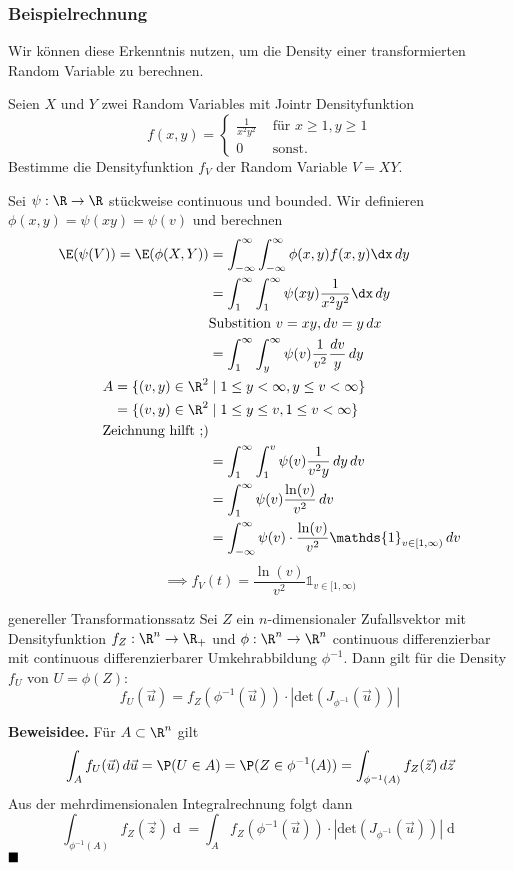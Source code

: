 \subsubsection*{Beispielrechnung}

Wir können diese Erkenntnis nutzen, um die Density einer transformierten Random Variable zu berechnen.

Seien $X$ und $Y$ zwei Random Variables mit Jointr Densityfunktion
$$f(x,y) = \begin{cases}
    \frac{1}{x^2y^2} & \text{ für } x \geq 1, y \geq 1\\
    0 & \text{ sonst.}
\end{cases}$$
Bestimme die Densityfunktion $f_V$ der Random Variable $V = XY$.

Sei $\psi: \R \to \R$ stückweise continuous und bounded.
Wir definieren $\phi(x, y) = \psi(xy) = \psi(v)$ und berechnen 
\begin{align*}
    \E(\psi(V)) = \E(\phi(X,Y)) &= \int_{-\infty}^{\infty}\int_{-\infty}^{\infty}\phi(x,y)f(x,y)\dx\mathop{dy}\\
    &= \int_{1}^{\infty}\int_{1}^{\infty}\psi(xy)\frac{1}{x^2y^2}\dx\mathop{dy}\\
    &\text{Substition } v = xy, \mathop{dv} = y\mathop{dx}\\
    &= \int_{1}^{\infty}\int_{y}^{\infty}\psi(v)\frac{1}{v^2}\frac{\mathop{dv}}{y}\mathop{dy}\\
    A = \{(v, y) \in \R^2 &\mid 1 \leq y < \infty, y \leq v < \infty\}\\
    = \{(v, y) \in \R^2 &\mid 1 \leq y \leq v, 1 \leq v < \infty\}\\
    \text{Zeichnung hilft ;)}\\
    &= \int_{1}^{\infty}\int_{1}^{v}\psi(v)\frac{1}{v^2y}\mathop{dy}\mathop{dv}\\
    &= \int_{1}^{\infty}\psi(v)\frac{\ln(v)}{v^2}\mathop{dv}\\
    &= \int_{-\infty}^{\infty}\psi(v) \cdot \frac{\ln(v)}{v^2}\mathds{1}_{v \in [1,\infty)}\mathop{dv}
\end{align*}
$$\implies f_V(t) = \frac{\ln(v)}{v^2}\mathds{1}_{v \in [1,\infty)}$$

\begin{mainbox}{genereller Transformationssatz}
    Sei $Z$ ein $n$-dimensionaler Zufallsvektor mit Densityfunktion $f_Z: \R^n \to \R_+$ und $\phi: \R^n \to \R^n$ continuous differenzierbar mit continuous differenzierbarer Umkehrabbildung $\phi^{-1}$. Dann gilt für die Density $f_U$ von $U = \phi(Z)$:
    \[f_U(\vec{u}) = f_Z\left(\phi^{-1}\left(\vec{u}\right)\right) \cdot |\text{det}(J_{\phi^{-1}}(\vec{u}))|\]
\end{mainbox}
\textbf{Beweisidee.} Für $A \subset \R^n$ gilt
\[\int_{A}f_U(\vec{u})\mathop{d\vec{u}} = \P(U \in A) = \P(Z \in \phi^{-1}(A)) = \int_{\phi^{-1}(A)}f_Z(\vec{z})\mathop{d\vec{z}}\]
Aus der mehrdimensionalen Integralrechnung folgt dann
\[\int_{\phi^{-1}(A)}f_Z(\vec{z})\mathop{d\vec{z}} = \int_{A}f_Z\left(\phi^{-1}\left(\vec{u}\right)\right) \cdot |\text{det}(J_{\phi^{-1}}(\vec{u}))|\mathop{d\vec{u}}\]
$\hfill\blacksquare$
